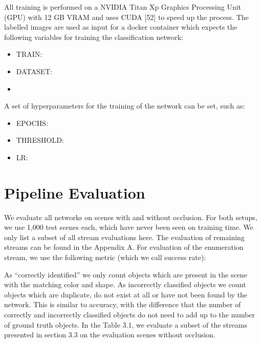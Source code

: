All training is performed on a NVIDIA Titan Xp Graphics Processing Unit (GPU) with 12 GB VRAM
and uses CUDA [52] to speed up the process.
The labelled images are used as input for a docker container which expects the following variables for training the classification network:
    \begin{itemize}
        \item TRAIN: 
        \item DATASET:
        \item 
    \end{itemize}
A set of hyperparameters for the training of the network can be set, such as:
\begin{itemize}
    \item EPOCHS:
    \item THRESHOLD:
    \item LR:
\end{itemize}

\section{Pipeline Evaluation}
We evaluate all networks on scenes with and without occlusion. For both setups, we use 1,000
test scenes each, which have never been seen on training time. We only list a subset of all stream
evaluations here. The evaluation of remaining streams can be found in the Appendix A. For evaluation
of the enumeration stream, we use the following metric (which we call success rate):


As “correctly identiﬁed” we only count objects which are present in the scene with the matching color
and shape. As incorrectly classiﬁed objects we count objects which are duplicate, do not exist at all or
have not been found by the network. This is similar to accuracy, with the diﬀerence that the number of
correctly and incorrectly classiﬁed objects do not need to add up to the number of ground truth objects.
In the Table 3.1, we evaluate a subset of the streams presented in section 3.3 on the evaluation scenes
without occlusion.

